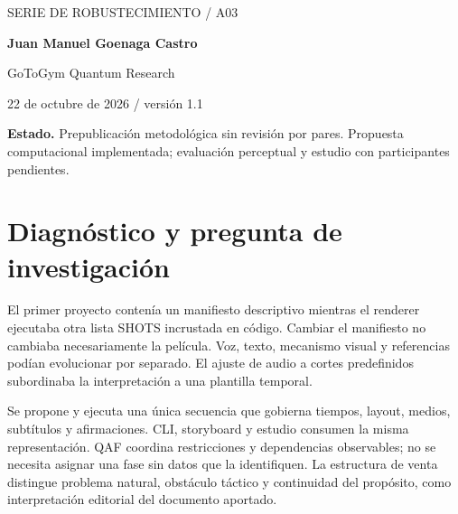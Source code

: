 \documentclass[10pt,a4paper]{article}
\begin{document}
\begin{center}{\sffamily\small\textcolor{mint}{SERIE DE ROBUSTECIMIENTO / A03}}\par\vspace{10pt}{\sffamily\LARGE\bfseries\textcolor{ink}{Sincronía audiovisual desde una secuencia canónica}}\par\vspace{7pt}{\large Contratos de cuadros, muestras, afirmaciones y montaje}\par\vspace{12pt}\textbf{Juan Manuel Goenaga Castro}\par GoToGym Quantum Research\par 22 de octubre de 2026 / versión 1.1\end{center}\colorbox{ink!6}{\parbox{.96\linewidth}{\small\textbf{Estado.} Prepublicación metodológica sin revisión por pares. Propuesta computacional implementada; evaluación perceptual y estudio con participantes pendientes.}}\begin{abstract}Se propone y ejecuta una única secuencia que gobierna tiempos, layout, medios, subtítulos y afirmaciones. CLI, storyboard y estudio consumen la misma representación. QAF coordina restricciones y dependencias observables; no se necesita asignar una fase sin datos que la identifiquen. La estructura de venta distingue problema natural, obstáculo táctico y continuidad del propósito, como interpretación editorial del documento aportado. Se presenta el problema observado, una formalización con unidades y restricciones, el código correspondiente y sus controles. Se distingue la verificación de ingeniería de calidad percibida, identidad regional y efecto comercial. El uso QAF corresponde a la región clásica identificable y conserva un comparador con los mismos recursos.\end{abstract}
\section{Diagnóstico y pregunta de investigación}
El primer proyecto contenía un manifiesto descriptivo mientras el renderer ejecutaba otra lista SHOTS incrustada en código. Cambiar el manifiesto no cambiaba necesariamente la película. Voz, texto, mecanismo visual y referencias podían evolucionar por separado. El ajuste de audio a cortes predefinidos subordinaba la interpretación a una plantilla temporal.

Se propone y ejecuta una única secuencia que gobierna tiempos, layout, medios, subtítulos y afirmaciones. CLI, storyboard y estudio consumen la misma representación. QAF coordina restricciones y dependencias observables; no se necesita asignar una fase sin datos que la identifiquen. La estructura de venta distingue problema natural, obstáculo táctico y continuidad del propósito, como interpretación editorial del documento aportado.
\end{document}
